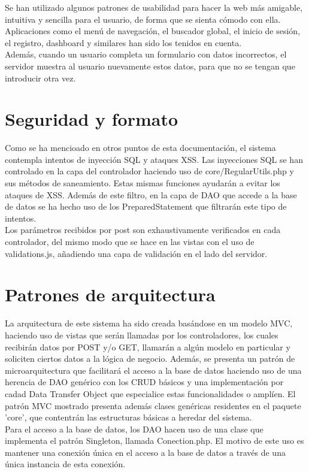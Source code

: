 Se han utilizado algunos patrones de usabilidad para hacer la web 
m\'{a}s amigable, intuitiva y sencilla para el usuario, de forma que se sienta c\'{o}modo con ella.
Aplicaciones como el men\'{u} de navegaci\'{o}n, el buscador global, el inicio de sesi\'{o}n, el registro,
dashboard y similares han sido los tenidos en cuenta.\\

Adem\'{a}s, cuando un usuario completa un formulario con datos incorrectos, el servidor 
muestra al usuario nuevamente estos datos, para que no se tengan que introducir otra vez.


\section{Seguridad y formato}

Como se ha mencioado en otros puntos de esta documentaci\'{o}n, el sistema contempla intentos de inyecci\'{o}n SQL y ataques XSS.
Las inyecciones SQL se han controlado en la capa del controlador haciendo uso de core/RegularUtils.php y sus m\'{e}todos de saneamiento.
Estas mismas funciones ayudar\'{a}n a evitar los ataques de XSS. Adem\'{a}s de este filtro, en la capa de DAO que accede a la base de datos
se ha hecho uso de los PreparedStatement que filtrar\'{a}n este tipo de intentos.\\

Los par\'{a}metros recibidos por post son exhaustivamente verificados en cada controlador, del mismo modo que se hace en las vistas con el uso
de validations.js, a\~{n}adiendo una capa de validaci\'{o}n en el lado del servidor.


\section{Patrones de arquitectura}
La arquitectura de este sistema ha sido creada bas\'{a}ndose en un modelo MVC, haciendo uso de vistas que ser\'{a}n llamadas
por los controladores, los cuales recibir\'{a}n datos por POST y/o GET, llamar\'{a}n a alg\'{u}n modelo en particular y soliciten ciertos
datos a la l\'{o}gica de negocio. Adem\'{a}s, se presenta un patr\'{o}n de microarquitectura que facilitar\'{a} el acceso a la base de datos haciendo uso
de una herencia de DAO gen\'{e}rico con los CRUD b\'{a}sicos y una implementaci\'{o}n por cadad Data Transfer Object que especialice estas funcionalidades 
o ampl\'{i}en. El patr\'{o}n MVC mostrado presenta adem\'{a}s clases gen\'{e}ricas residentes en el paquete 'core',
que contentr\'{a}n las estructuras b\'{a}sicas a heredar del sistema. \\

Para el acceso a la base de datos, los DAO hacen uso de una clase que implementa el patr\'{o}n Singleton, llamada Conection.php. El motivo de este uso 
es mantener una conexi\'{o}n \'{u}nica en el acceso a la base de datos a trav\'{e}s de una \'{u}nica instancia de esta conexi\'{o}n.


